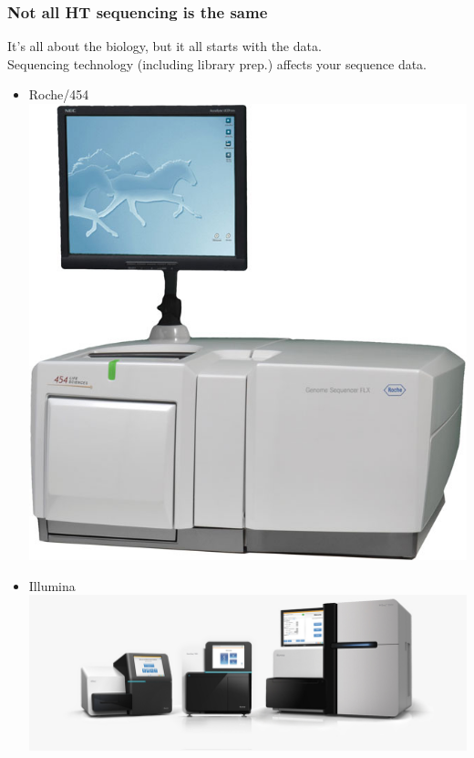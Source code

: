 \begin{frame}
  \frametitle{Not all HT sequencing is the same}
  It's all about the biology, but it all starts with the data.\\
  Sequencing technology (including library prep.) affects your sequence data.
  \begin{itemize}
    \item Roche/454 \includegraphics[height=0.15\textheight]{images/454_sequencer}
    \item Illumina \includegraphics[height=0.15\textheight]{images/miseq_nextseq_hiseq}

\end{itemize}
\end{frame}
